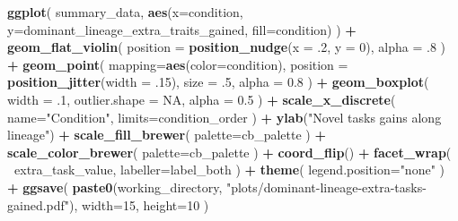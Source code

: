 \documentclass[]{book}
\newenvironment{Shaded}{\begin{snugshade}}{\end{snugshade}}
\newcommand{\DataTypeTok}[1]{\textcolor[rgb]{0.13,0.29,0.53}{#1}}
\newcommand{\DecValTok}[1]{\textcolor[rgb]{0.00,0.00,0.81}{#1}}
\newcommand{\FloatTok}[1]{\textcolor[rgb]{0.00,0.00,0.81}{#1}}
\newcommand{\KeywordTok}[1]{\textcolor[rgb]{0.13,0.29,0.53}{\textbf{#1}}}
\newcommand{\NormalTok}[1]{#1}
\newcommand{\OperatorTok}[1]{\textcolor[rgb]{0.81,0.36,0.00}{\textbf{#1}}}
\newcommand{\OtherTok}[1]{\textcolor[rgb]{0.56,0.35,0.01}{#1}}
\newcommand{\StringTok}[1]{\textcolor[rgb]{0.31,0.60,0.02}{#1}}
\begin{document}
\begin{Shaded}
\begin{Highlighting}[]
\KeywordTok{ggplot}\NormalTok{(}
\NormalTok{    summary_data,}
    \KeywordTok{aes}\NormalTok{(}\DataTypeTok{x=}\NormalTok{condition, }\DataTypeTok{y=}\NormalTok{dominant_lineage_extra_traits_gained, }\DataTypeTok{fill=}\NormalTok{condition)}
\NormalTok{  ) }\OperatorTok{+}
\StringTok{  }\KeywordTok{geom_flat_violin}\NormalTok{(}
    \DataTypeTok{position =} \KeywordTok{position_nudge}\NormalTok{(}\DataTypeTok{x =} \FloatTok{.2}\NormalTok{, }\DataTypeTok{y =} \DecValTok{0}\NormalTok{),}
    \DataTypeTok{alpha =} \FloatTok{.8}
\NormalTok{  ) }\OperatorTok{+}
\StringTok{  }\KeywordTok{geom_point}\NormalTok{(}
    \DataTypeTok{mapping=}\KeywordTok{aes}\NormalTok{(}\DataTypeTok{color=}\NormalTok{condition),}
    \DataTypeTok{position =} \KeywordTok{position_jitter}\NormalTok{(}\DataTypeTok{width =} \FloatTok{.15}\NormalTok{),}
    \DataTypeTok{size =} \FloatTok{.5}\NormalTok{,}
    \DataTypeTok{alpha =} \FloatTok{0.8}
\NormalTok{  ) }\OperatorTok{+}
\StringTok{  }\KeywordTok{geom_boxplot}\NormalTok{(}
    \DataTypeTok{width =} \FloatTok{.1}\NormalTok{,}
    \DataTypeTok{outlier.shape =} \OtherTok{NA}\NormalTok{,}
    \DataTypeTok{alpha =} \FloatTok{0.5}
\NormalTok{  ) }\OperatorTok{+}
\StringTok{  }\KeywordTok{scale_x_discrete}\NormalTok{(}
    \DataTypeTok{name=}\StringTok{"Condition"}\NormalTok{,}
    \DataTypeTok{limits=}\NormalTok{condition_order}
\NormalTok{  ) }\OperatorTok{+}
\StringTok{  }\KeywordTok{ylab}\NormalTok{(}\StringTok{"Novel tasks gains along lineage"}\NormalTok{) }\OperatorTok{+}
\StringTok{  }\KeywordTok{scale_fill_brewer}\NormalTok{(}
    \DataTypeTok{palette=}\NormalTok{cb_palette}
\NormalTok{  ) }\OperatorTok{+}
\StringTok{  }\KeywordTok{scale_color_brewer}\NormalTok{(}
    \DataTypeTok{palette=}\NormalTok{cb_palette}
\NormalTok{  ) }\OperatorTok{+}
\StringTok{  }\KeywordTok{coord_flip}\NormalTok{() }\OperatorTok{+}
\StringTok{  }\KeywordTok{facet_wrap}\NormalTok{(}
    \OperatorTok{~}\NormalTok{extra_task_value,}
    \DataTypeTok{labeller=}\NormalTok{label_both}
\NormalTok{  ) }\OperatorTok{+}
\StringTok{  }\KeywordTok{theme}\NormalTok{(}
    \DataTypeTok{legend.position=}\StringTok{"none"}
\NormalTok{  ) }\OperatorTok{+}
\StringTok{  }\KeywordTok{ggsave}\NormalTok{(}
    \KeywordTok{paste0}\NormalTok{(working_directory, }\StringTok{"plots/dominant-lineage-extra-tasks-gained.pdf"}\NormalTok{),}
    \DataTypeTok{width=}\DecValTok{15}\NormalTok{,}
    \DataTypeTok{height=}\DecValTok{10}
\NormalTok{  )}
\end{Highlighting}
\end{Shaded}
\end{document}
